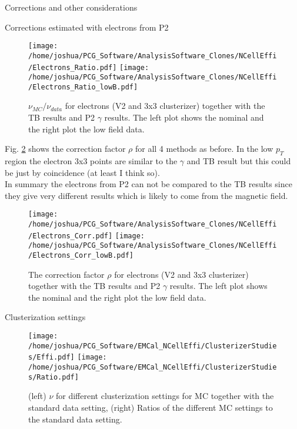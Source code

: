 \documentclass[ALICE]{ALICE_analysis_notes}
\begin{document}
\begin{section}{Corrections and other considerations}
\begin{subsection}{Corrections estimated with electrons from P2}
\begin{figure}[ht!]
	\centering
	\texttt{[image: /home/joshua/PCG\_Software/AnalysisSoftware\_Clones/NCellEffi/Electrons\_Ratio.pdf]}	
	\texttt{[image: /home/joshua/PCG\_Software/AnalysisSoftware\_Clones/NCellEffi/Electrons\_Ratio\_lowB.pdf]}
	
	\caption{  $\nu_{MC}/\nu_{data}$ for electrons (V2 and 3x3 clusterizer) together with the TB results and P2 $\gamma$ results. The left plot shows the nominal and the right plot the low field data.   }
	\label{fig:electrons_Ratio}
\end{figure}

Fig. \ref{fig:electrons_Corr} shows the correction factor $\rho$ for all 4 methods as before. In the low $p_{T}$ region the electron 3x3 points are similar to the $\gamma$ and TB result but this could be just by coincidence (at least I think so).\\
In summary the electrons from P2 can not be compared to the TB results since they give very different results which is likely to come from the magnetic field.
\begin{figure}[ht!]
	\centering
	\texttt{[image: /home/joshua/PCG\_Software/AnalysisSoftware\_Clones/NCellEffi/Electrons\_Corr.pdf]}	
	\texttt{[image: /home/joshua/PCG\_Software/AnalysisSoftware\_Clones/NCellEffi/Electrons\_Corr\_lowB.pdf]}
	
	\caption{  The correction factor $\rho$ for electrons (V2 and 3x3 clusterizer) together with the TB results and P2 $\gamma$ results. The left plot shows the nominal and the right plot the low field data.   }
	\label{fig:electrons_Corr}
\end{figure}

\end{subsection}

\begin{subsection}{Clusterization settings}
	\begin{figure}[ht!]
		\centering
		\texttt{[image: /home/joshua/PCG\_Software/EMCal\_NCellEffi/ClusterizerStudies/Effi.pdf]}	
		\texttt{[image: /home/joshua/PCG\_Software/EMCal\_NCellEffi/ClusterizerStudies/Ratio.pdf]}
		
		\caption{  (left) $\nu$ for different clusterization settings for MC together with the standard data setting, (right) Ratios of the different MC settings to the standard data setting.  }
		\label{fig:clusterization}
	\end{figure}


\end{subsection}
\end{section}
\end{document}
